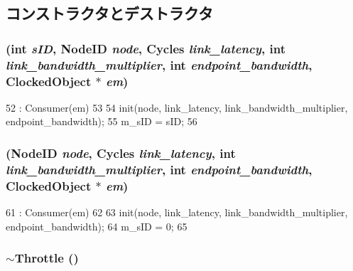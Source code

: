 \subsection{コンストラクタとデストラクタ}
\hypertarget{classThrottle_a0602108471e008c6df07e555050c3dc0}{
\subsubsection[{Throttle}]{ (int {\em sID}, \/  {\bf NodeID} {\em node}, \/  {\bf Cycles} {\em link\_\-latency}, \/  int {\em link\_\-bandwidth\_\-multiplier}, \/  int {\em endpoint\_\-bandwidth}, \/  {\bf ClockedObject} $\ast$ {\em em})}}
\label{classThrottle_a0602108471e008c6df07e555050c3dc0}



\begin{DoxyCode}
52     : Consumer(em)
53 {
54     init(node, link_latency, link_bandwidth_multiplier, endpoint_bandwidth);
55     m_sID = sID;
56 }
\end{DoxyCode}
\hypertarget{classThrottle_a636891f4e5e366c44ed904a857922f4b}{
\subsubsection[{Throttle}]{ ({\bf NodeID} {\em node}, \/  {\bf Cycles} {\em link\_\-latency}, \/  int {\em link\_\-bandwidth\_\-multiplier}, \/  int {\em endpoint\_\-bandwidth}, \/  {\bf ClockedObject} $\ast$ {\em em})}}
\label{classThrottle_a636891f4e5e366c44ed904a857922f4b}



\begin{DoxyCode}
61     : Consumer(em)
62 {
63     init(node, link_latency, link_bandwidth_multiplier, endpoint_bandwidth);
64     m_sID = 0;
65 }
\end{DoxyCode}
\hypertarget{classThrottle_a341eb535e7be72b9c4b6d3974864f20b}{
\subsubsection[{$\sim$Throttle}]{\setlength{\rightskip}{0pt plus 5cm}$\sim${\bf Throttle} ()}}
\label{classThrottle_a341eb535e7be72b9c4b6d3974864f20b}



